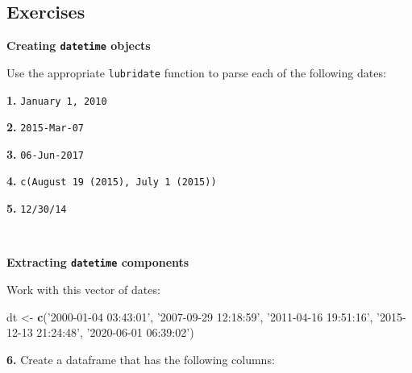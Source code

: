 \documentclass[]{book}
\newenvironment{Shaded}{\begin{snugshade}}{\end{snugshade}}
\newcommand{\CommentTok}[1]{\textcolor[rgb]{0.56,0.35,0.01}{\textit{#1}}}
\newcommand{\DecValTok}[1]{\textcolor[rgb]{0.00,0.00,0.81}{#1}}
\newcommand{\KeywordTok}[1]{\textcolor[rgb]{0.13,0.29,0.53}{\textbf{#1}}}
\newcommand{\NormalTok}[1]{#1}
\newcommand{\OperatorTok}[1]{\textcolor[rgb]{0.81,0.36,0.00}{\textbf{#1}}}
\newcommand{\StringTok}[1]{\textcolor[rgb]{0.31,0.60,0.02}{#1}}
\begin{document}
\begin{Shaded}
\end{Shaded}

\hypertarget{exercises-17}{%
\subsection*{Exercises}\label{exercises-17}}

\textbf{Creating \texttt{datetime} objects}

Use the appropriate \texttt{lubridate} function to parse each of the following dates:

\textbf{1.} \texttt{January\ 1,\ 2010}

\textbf{2.} \texttt{2015-Mar-07}

\textbf{3.} \texttt{06-Jun-2017}

\textbf{4.} \texttt{c(\textquotesingle{}August\ 19\ (2015)\textquotesingle{},\ \textquotesingle{}July\ 1\ (2015)\textquotesingle{})}

\textbf{5.} \texttt{12/30/14}

~

\textbf{Extracting \texttt{datetime} components}

Work with this vector of dates:

\begin{Shaded}
\begin{Highlighting}[]
\NormalTok{dt <-}\StringTok{ }\KeywordTok{c}\NormalTok{(}\StringTok{'2000-01-04 03:43:01'}\NormalTok{,}
        \StringTok{'2007-09-29 12:18:59'}\NormalTok{,}
        \StringTok{'2011-04-16 19:51:16'}\NormalTok{,}
        \StringTok{'2015-12-13 21:24:48'}\NormalTok{,}
        \StringTok{'2020-06-01 06:39:02'}\NormalTok{)}
\end{Highlighting}
\end{Shaded}

\textbf{6.} Create a dataframe that has the following columns:
\end{document}
